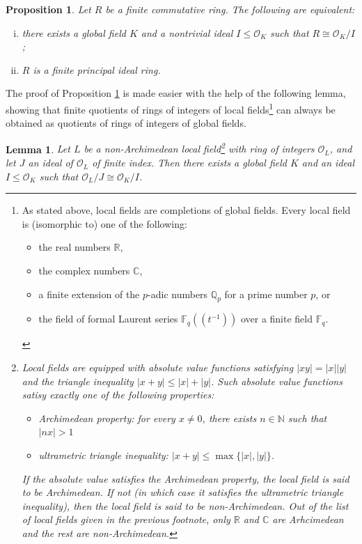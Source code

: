 \documentclass{amsart}
\newtheorem{lemma}[theorem]{Lemma}
\newtheorem{proposition}[theorem]{Proposition}
\theoremstyle{definition}
\numberwithin{equation}{section}
\newcommand{\N}{\mathbb{N}}
\newcommand{\Q}{\mathbb{Q}}
\newcommand{\R}{\mathbb{R}}
\newcommand{\C}{\mathbb{C}}
\newcommand{\F}{\mathbb{F}}
\newcommand{\mO}{\mathcal{O}}
\begin{document}
\begin{proposition} \label{prop: good iff principal}
    Let $R$ be a finite commutative ring.
    The following are equivalent:
    \begin{enumerate}[(i)]
        \item there exists a global field $K$ and a nontrivial ideal $I \le \mO_K$ such that $R \cong \mO_K/I$;
        \item $R$ is a finite principal ideal ring.
    \end{enumerate}
\end{proposition}

The proof of Proposition \ref{prop: good iff principal} is made easier with the help of the following lemma, showing that finite quotients of rings of integers of local fields\footnote{As stated above, local fields are completions of global fields. Every local field is (isomorphic to) one of the following:
\begin{itemize}
    \item the real numbers $\R$,
    \item the complex numbers $\C$,
    \item a finite extension of the $p$-adic numbers $\Q_p$ for a prime number $p$, or
    \item the field of formal Laurent series $\F_q((t^{-1}))$ over a finite field $\F_q$.
\end{itemize}} can always be obtained as quotients of rings of integers of global fields.

\begin{lemma} \label{lem: local field quotients}
    Let $L$ be a non-Archimedean local field\footnote{Local fields are equipped with absolute value functions satisfying $|xy| = |x||y|$ and the triangle inequality $|x+y| \le |x|+|y|$.
    Such absolute value functions satisy exactly one of the following properties:
    \begin{itemize}
        \item Archimedean property: for every $x \ne 0$, there exists $n \in \N$ such that $|nx| > 1$
        \item ultrametric triangle inequality: $|x+y| \le \max\{|x|,|y|\}$.
    \end{itemize}
    If the absolute value satisfies the Archimedean property, the local field is said to be Archimedean.
    If not (in which case it satisfies the ultrametric triangle inequality), then the local field is said to be non-Archimedean.
    Out of the list of local fields given in the previous footnote, only $\R$ and $\C$ are Arhcimedean and the rest are non-Archimedean.} with ring of integers $\mO_L$, and let $J$ an ideal of $\mO_L$ of finite index.
    Then there exists a global field $K$ and an ideal $I \le \mO_K$ such that $\mO_L/J \cong \mO_K/I$.
\end{lemma}
\end{document}
